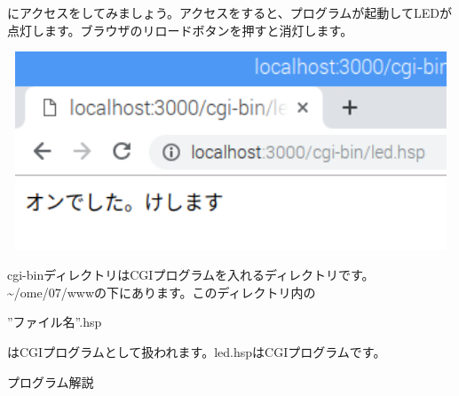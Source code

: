 \documentclass[a4paper,12pt,dvipdfmx]{jarticle}
\begin{document}
にアクセスをしてみましょう。アクセスをすると、プログラムが起動してLEDが点灯します。ブラウザのリロードボタンを押すと消灯します。

\centering
\includegraphics[width=16.166cm,height=5.911cm]{ome7-img052.png}
\flushleft

cgi-binディレクトリはCGIプログラムを入れるディレクトリです。\~{}/ome/07/wwwの下にあります。このディレクトリ内の

”ファイル名”.hsp

はCGIプログラムとして扱われます。led.hspはCGIプログラムです。


\bigskip

\clearpage
プログラム解説
\end{document}
